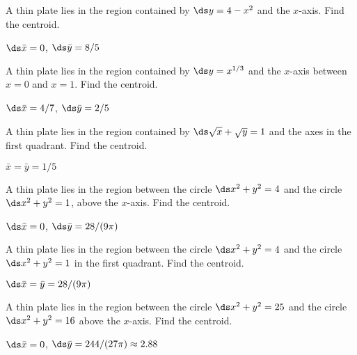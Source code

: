 \begin{enumialphparenastyle}
\begin{ex}
A thin plate lies in the region contained by $\ds y=4-x^2$ and
the $x$-axis. Find the centroid.
\begin{sol}
$\ds \bar x=0$, $\ds \bar y=8/5$
\end{sol}
\end{ex}

\begin{ex}
A thin plate lies in the region contained by $\ds y=x^{1/3}$ and
the $x$-axis between $x=0$ and $x=1$. Find the centroid.
\begin{sol}
$\ds \bar x=4/7$, $\ds \bar y=2/5$
\end{sol}
\end{ex}

\begin{ex}
A thin plate lies in the region contained by 
$\ds \sqrt{x}+\sqrt{y}=1$ and the axes in the first quadrant.
Find the centroid.
\begin{sol}
$\bar x=\bar y=1/5$
\end{sol}
\end{ex}

\begin{ex}
A thin plate lies in the region between
the circle $\ds x^2+y^2=4$ and the circle $\ds x^2+y^2=1$, above the $x$-axis.
Find the centroid.
\begin{sol}
$\ds \bar x=0$, $\ds \bar y=28/(9\pi)$
\end{sol}
\end{ex}

\begin{ex}
A thin plate lies in the region between 
the circle $\ds x^2+y^2=4$ and the circle $\ds x^2+y^2=1$ in the first quadrant.
Find the centroid.
\begin{sol}
$\ds \bar x=\bar y=28/(9\pi)$
\end{sol}
\end{ex}

\begin{ex}
A thin plate lies in the region between 
the circle $\ds x^2+y^2=25$ and the circle $\ds x^2+y^2=16$
above the $x$-axis.
Find the centroid.
\begin{sol}
$\ds \bar x=0$, $\ds\bar y=244/(27\pi)\approx 2.88$
\end{sol}
\end{ex}

\end{enumialphparenastyle}
